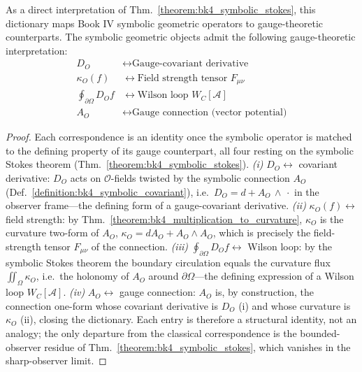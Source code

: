 \begin{proposition}
\label{proposition:bk4_gauge_dictionary}
As a direct interpretation of Thm.~\ref{theorem:bk4_symbolic_stokes}, this dictionary maps Book IV symbolic geometric operators to gauge-theoretic counterparts.
The symbolic geometric objects admit the following gauge-theoretic interpretation:
\begin{align}
D_O &\leftrightarrow \text{Gauge-covariant derivative} \\
\kappa_O(f) &\leftrightarrow \text{Field strength tensor } F_{\mu\nu} \\
\oint_{\partial\Omega} D_O f &\leftrightarrow \text{Wilson loop } W_C[\mathcal{A}] \\
A_O &\leftrightarrow \text{Gauge connection (vector potential)}
\end{align}
\end{proposition}

\begin{proof}
\label{proof:bk4_gauge_dictionary}
\leavevmode
Each correspondence is an identity once the symbolic operator is matched to the defining property of its gauge counterpart, all four resting on the symbolic Stokes theorem (Thm.~\ref{theorem:bk4_symbolic_stokes}).
\emph{(i)} $D_O \leftrightarrow$ covariant derivative: $D_O$ acts on $\mathcal{O}$-fields twisted by the symbolic connection $A_O$ (Def.~\ref{definition:bk4_symbolic_covariant}), i.e.\ $D_O = d + A_O\,\wedge\,\cdot$ in the observer frame---the defining form of a gauge-covariant derivative.
\emph{(ii)} $\kappa_O(f) \leftrightarrow$ field strength: by Thm.~\ref{theorem:bk4_multiplication_to_curvature}, $\kappa_O$ is the curvature two-form of $A_O$, $\kappa_O = dA_O + A_O\wedge A_O$, which is precisely the field-strength tensor $F_{\mu\nu}$ of the connection.
\emph{(iii)} $\oint_{\partial\Omega} D_O f \leftrightarrow$ Wilson loop: by the symbolic Stokes theorem the boundary circulation equals the curvature flux $\iint_\Omega \kappa_O$, i.e.\ the holonomy of $A_O$ around $\partial\Omega$---the defining expression of a Wilson loop $W_C[\mathcal{A}]$.
\emph{(iv)} $A_O \leftrightarrow$ gauge connection: $A_O$ is, by construction, the connection one-form whose covariant derivative is $D_O$ (i) and whose curvature is $\kappa_O$ (ii), closing the dictionary.
Each entry is therefore a structural identity, not an analogy; the only departure from the classical correspondence is the bounded-observer residue of Thm.~\ref{theorem:bk4_symbolic_stokes}, which vanishes in the sharp-observer limit.
\end{proof}

